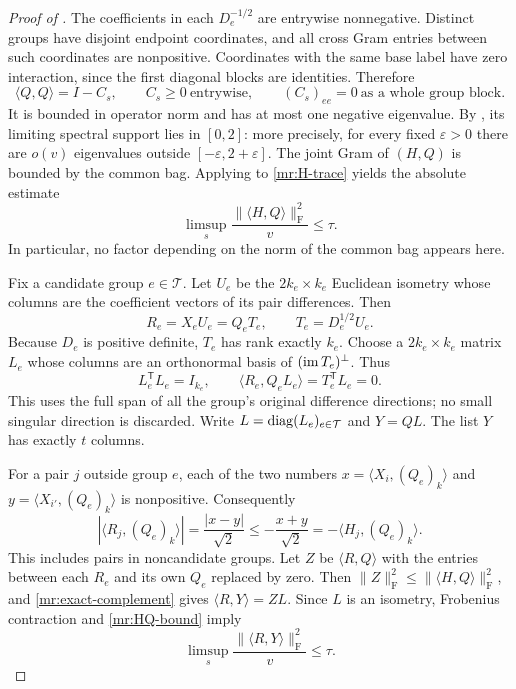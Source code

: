 \begin{proof}[Proof of ]
The coefficients in each $D_e^{-1/2}$ are entrywise nonnegative.
Distinct groups have disjoint endpoint coordinates, and all cross Gram
entries between such coordinates are nonpositive.  Coordinates with
the same base label have zero interaction, since the first diagonal
blocks are identities.  Therefore
\begin{equation}\label{mr:Q-sign}
 \langle Q,Q\rangle=I-C_s,
 \qquad C_s\ge0\ \text{entrywise},
 \qquad (C_s)_{ee}=0\ \text{as a whole group block}.
\end{equation}
It is bounded in operator norm and has at most one negative eigenvalue.
By , its limiting spectral support lies in
$[0,2]$: more precisely, for every fixed $\varepsilon>0$ there are
$o(v)$ eigenvalues outside $[-\varepsilon,2+\varepsilon]$.
The joint Gram of $(H,Q)$ is bounded by the common bag.  Applying
 to \eqref{mr:H-trace} yields the absolute estimate
\begin{equation}\label{mr:HQ-bound}
 \limsup_s\frac{\|\langle H,Q\rangle\|_{\mathrm F}^2}{v}
 \le\tau.
\end{equation}
In particular, no factor depending on the norm of the common bag
appears here.

Fix a candidate group $e\in\mathcal T$. Let $U_e$ be the
$2k_e\times k_e$ Euclidean isometry whose columns are the coefficient
vectors of its pair differences. Then
\[
 R_e=X_eU_e=Q_e T_e,
 \qquad T_e=D_e^{1/2}U_e.
\]
Because $D_e$ is positive definite, $T_e$ has rank exactly $k_e$.
Choose a $2k_e\times k_e$ matrix $L_e$ whose columns are an orthonormal
basis of $(\operatorname{im} T_e)^\perp$.  Thus
\begin{equation}\label{mr:exact-complement}
 L_e^{\mathsf T}L_e=I_{k_e},
 \qquad\langle R_e,Q_eL_e\rangle=T_e^{\mathsf T}L_e=0.
\end{equation}
This uses the full span of all the group's original difference
directions; no small singular direction is discarded.  Write
$L=\operatorname{diag}(L_e)_{e\in\mathcal T}$ and $Y=QL$.  The list $Y$ has
exactly $t$ columns.

For a pair $j$ outside group $e$, each of the two numbers
$x=\langle X_i,(Q_e)_k\rangle$ and
$y=\langle X_{i'},(Q_e)_k\rangle$ is nonpositive.  Consequently
\begin{equation}\label{mr:sign-domination}
 |\langle R_j,(Q_e)_k\rangle|
    =\frac{|x-y|}{\sqrt2}
    \le-\frac{x+y}{\sqrt2}
    =-\langle H_j,(Q_e)_k\rangle.
\end{equation}
This includes pairs in noncandidate groups.  Let $Z$ be
$\langle R,Q\rangle$ with the entries between each $R_e$ and its
own $Q_e$ replaced by zero.  Then
$\|Z\|_{\mathrm F}^2\le\|\langle H,Q\rangle\|_{\mathrm F}^2$,
and \eqref{mr:exact-complement} gives
$\langle R,Y\rangle=ZL$.  Since $L$ is an isometry, Frobenius
contraction and \eqref{mr:HQ-bound} imply
\begin{equation}\label{mr:RY-bound}
 \limsup_s\frac{\|\langle R,Y\rangle\|_{\mathrm F}^2}{v}
 \le\tau.
\end{equation}


\end{proof}
